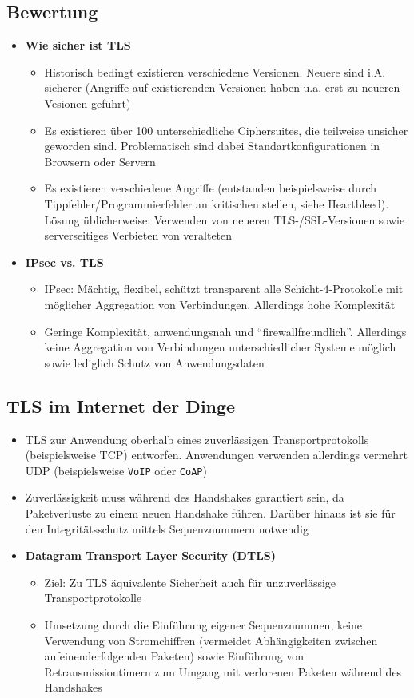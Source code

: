 \subsection{Bewertung}
\begin{itemize}
	\item \textbf{Wie sicher ist TLS}
	\begin{itemize}
		\item Historisch bedingt existieren verschiedene Versionen. Neuere sind i.A. sicherer (Angriffe auf existierenden Versionen haben u.a. erst zu neueren Vesionen geführt)
		\item Es existieren über 100 unterschiedliche Ciphersuites, die teilweise unsicher geworden sind. Problematisch sind dabei Standartkonfigurationen in Browsern oder Servern
		\item Es existieren verschiedene Angriffe (entstanden beispielsweise durch Tippfehler/Programmierfehler an kritischen stellen, siehe Heartbleed). Lösung üblicherweise: Verwenden von neueren TLS-/SSL-Versionen sowie serverseitiges Verbieten von veralteten
	\end{itemize}
	\item \textbf{IPsec vs. TLS}
	\begin{itemize}
		\item IPsec: Mächtig, flexibel, schützt transparent alle Schicht-4-Protokolle mit möglicher Aggregation von Verbindungen. Allerdings hohe Komplexität
		\item Geringe Komplexität, anwendungsnah und "`firewallfreundlich"'. Allerdings keine Aggregation von Verbindungen unterschiedlicher Systeme möglich sowie lediglich Schutz von Anwendungsdaten
	\end{itemize}
\end{itemize}


\subsection{TLS im Internet der Dinge}
\begin{itemize}
	\item TLS zur Anwendung oberhalb eines zuverlässigen Transportprotokolls (beispielsweise TCP) entworfen. Anwendungen verwenden allerdings vermehrt UDP (beispielsweise \texttt{VoIP} oder \texttt{CoAP})
	\item Zuverlässigkeit muss während des Handshakes garantiert sein, da Paketverluste zu einem neuen Handshake führen. Darüber hinaus ist sie für den Integritätsschutz mittels Sequenznummern notwendig
	\item \textbf{Datagram Transport Layer Security (DTLS)}
	\begin{itemize}
		\item Ziel: Zu TLS äquivalente Sicherheit auch für unzuverlässige Transportprotokolle
		\item Umsetzung durch die Einführung eigener Sequenznummen, keine Verwendung von Stromchiffren (vermeidet Abhängigkeiten zwischen aufeinenderfolgenden Paketen) sowie Einführung von Retransmissiontimern zum Umgang mit verlorenen Paketen während des Handshakes
	\end{itemize}
\end{itemize}




